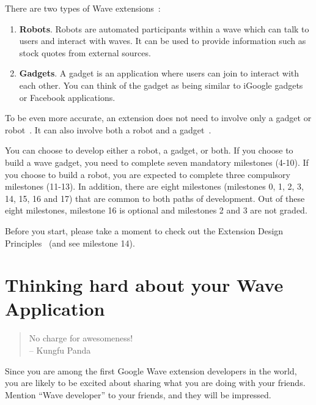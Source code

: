 There are two types of Wave extensions~\cite{googlewave_wiki}:
\begin{enumerate}
\item \textbf{Robots}. Robots are automated participants within a wave 
which can talk to users and interact with waves. It can be used to
provide information such as stock quotes from external sources.
\item \textbf{Gadgets}. A gadget is an application where users can join 
to interact with each other. You can think of the gadget as being
similar to iGoogle gadgets or Facebook applications.
\end{enumerate}
To be even more accurate, an extension does not need to involve only a
gadget or robot~\cite{yellow_highlight}. It can also involve both a
robot and a gadget~\cite{connect4}.

You can choose to develop either a robot, a gadget, or both. If you
choose to build a wave gadget, you need to complete seven mandatory
milestones (4-10). If you choose to build a robot, you are expected to
complete three compulsory milestones (11-13). In addition, there are
eight milestones (milestones 0, 1, 2, 3, 14, 15, 16 and 17) that are
common to both paths of development. Out of these eight milestones,
milestone 16 is optional and milestones 2 and 3 are not graded.

Before you start, please take a moment to check out the Extension
Design Principles~\cite{googlewave_extension_principles} (and see
milestone 14).


\section{Thinking hard about your Wave Application}
\begin{center}
\begin{quote}
No charge for awesomeness!\\
\hfill -- Kungfu Panda
\end{quote}
\end{center}

Since you are among the first Google Wave extension developers in the
world, you are likely to be excited about sharing what you are doing
with your friends. Mention ``Wave developer'' to your friends, and
they will be impressed.

